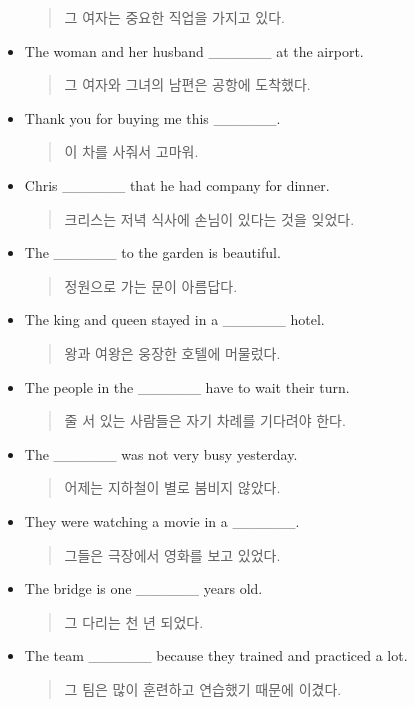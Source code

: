 \documentclass{article}
\begin{document}
\begin{addmargin}[1em]{1em}
\begin{itemize}
    \begin{quote}
    그 여자는 중요한 직업을 가지고 있다.
    \end{quote}
    \item The woman and her husband \_\_\_\_\_\_ at the airport.
    \begin{quote}
    그 여자와 그녀의 남편은 공항에 도착했다.
    \end{quote}
    \item Thank you for buying me this \_\_\_\_\_\_.
    \begin{quote}
    이 차를 사줘서 고마워.
    \end{quote}
    \item Chris \_\_\_\_\_\_ that he had company for dinner.
    \begin{quote}
    크리스는 저녁 식사에 손님이 있다는 것을 잊었다.
    \end{quote}
    \item The \_\_\_\_\_\_ to the garden is beautiful.
    \begin{quote}
    정원으로 가는 문이 아름답다.
    \end{quote}
    \item The king and queen stayed in a \_\_\_\_\_\_ hotel.
    \begin{quote}
    왕과 여왕은 웅장한 호텔에 머물렀다.
    \end{quote}
    \item The people in the \_\_\_\_\_\_ have to wait their turn.
    \begin{quote}
    줄 서 있는 사람들은 자기 차례를 기다려야 한다.
    \end{quote}
    \item The \_\_\_\_\_\_ was not very busy yesterday.
    \begin{quote}
    어제는 지하철이 별로 붐비지 않았다.
    \end{quote}
    \item They were watching a movie in a \_\_\_\_\_\_.
    \begin{quote}
    그들은 극장에서 영화를 보고 있었다.
    \end{quote}
    \item The bridge is one \_\_\_\_\_\_ years old.
    \begin{quote}
    그 다리는 천 년 되었다.
    \end{quote}
    \item The team \_\_\_\_\_\_ because they trained and practiced a lot.
    \begin{quote}
    그 팀은 많이 훈련하고 연습했기 때문에 이겼다.

\end{quote}
\end{itemize}
\end{addmargin}
\end{document}
